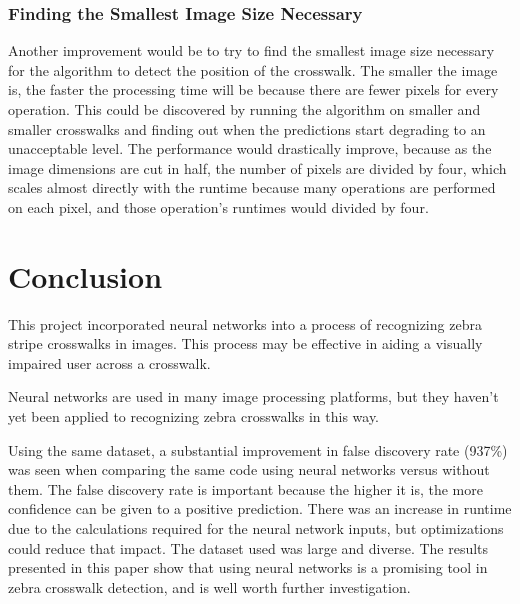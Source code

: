 \documentclass[12pt]{ucthesis}
\begin{document}
\subsection{Finding the Smallest Image Size Necessary}
Another improvement would be to try to find the smallest image size necessary for the algorithm to detect the position of the crosswalk. The smaller the image is, the faster the processing time will be because there are fewer pixels for every operation. This could be discovered by running the algorithm on smaller and smaller crosswalks and finding out when the predictions start degrading to an unacceptable level. The performance would drastically improve, because as the image dimensions are cut in half, the number of pixels are divided by four, which scales almost directly with the runtime because many operations are performed on each pixel, and those operation's runtimes would divided by four. 

\chapter{Conclusion}
\label{conclusion}

This project incorporated neural networks into a process of recognizing zebra stripe crosswalks in images. This process may be effective in aiding a visually impaired user across a crosswalk. 

Neural networks are used in many image processing platforms, but they haven't yet been applied to recognizing zebra crosswalks in this way.


Using the same dataset, a substantial improvement in false discovery rate (937\%) was seen when comparing the same code using neural networks versus without them. The false discovery rate is important because the higher it is, the more confidence can be given to a positive prediction. There was an increase in runtime due to the calculations required for the neural network inputs, but optimizations could reduce that impact. The dataset used was large and diverse. The results presented in this paper show that using neural networks is a promising tool in zebra crosswalk detection, and is well worth further investigation.
\end{document}
